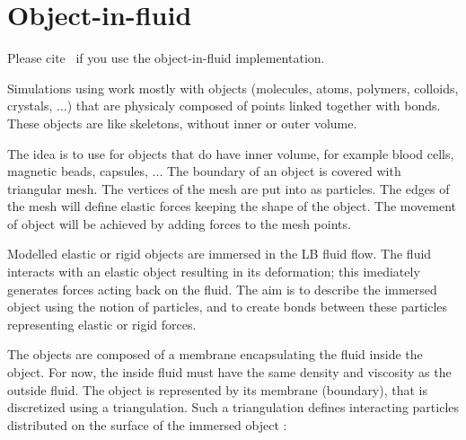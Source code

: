 %  
%   
%  
%  
%

\chapter{Object-in-fluid}
\label{sec:fsi}

\begin{citebox}
  Please cite~ if you use the object-in-fluid implementation.
\end{citebox}


Simulations using \es work mostly with objects (molecules, atoms, 
polymers, colloids, crystals, ...) that are physicaly composed of points linked 
together with bonds. These objects are like skeletons, without inner or outer volume. 

The idea is to use \es for objects that do have inner volume, for example blood cells, 
magnetic beads, capsules, ... The boundary of an object is covered with triangular 
mesh. The vertices of the mesh are put into \es as particles. The edges of the mesh 
will define elastic forces keeping the shape of the object. The movement of 
object will be achieved by adding forces to the mesh points.

Modelled elastic or rigid objects are immersed in the LB fluid flow. The fluid interacts 
with an elastic object resulting in its deformation; this imediately generates forces 
acting back on the fluid. The aim is to describe the immersed object using the notion of 
particles, and to create bonds between these particles representing elastic or rigid 
forces.

The objects are composed of a membrane encapsulating the fluid inside the object. For 
now, the inside fluid must have the same density and viscosity as the outside fluid. 
The object is represented by its membrane (boundary), that is discretized using a 
triangulation. Such a triangulation defines interacting particles distributed 
on the surface of the immersed object \cite{dupin07}:

